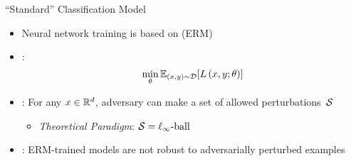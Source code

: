 \begin{frame}{``Standard'' Classification Model}
  \begin{itemize}[<+->]
    \setlength{\itemsep}{20pt}
    \item Neural network training is based on \textit{} (ERM)
    \item \textbf{}:
      \begin{equation}\label{eq:ERM}
        \min_{\theta} \mathbb{E}_{(x,y) \sim \mathcal{D}} \lbrack L \left( x, y ; \theta \right)\rbrack
      \end{equation}

    \item \textit{}: For any ${x \in \mathbb{R}^{d}}$, adversary can make a set of allowed perturbations~$\mathcal{S}$
      \begin{itemize}
        \item \textit{Theoretical Paradigm}: $\mathcal{S} = \ell_{\infty}\text{-ball}$
      \end{itemize}

    \item \textbf{}: ERM-trained models are not robust to adversarially perturbed examples~\cite{Biggio:2013,Szegedy:2013}
  \end{itemize}
\end{frame}


